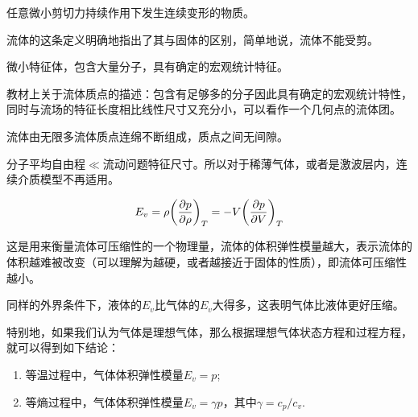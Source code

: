 


\begin{definition}[流体]
	任意微小剪切力持续作用下发生连续变形的物质。
\end{definition}

\begin{tip}
	流体的这条定义明确地指出了其与固体的区别，简单地说，流体不能受剪。
\end{tip}


\begin{definition}
	微小特征体，包含大量分子，具有确定的宏观统计特征。
\end{definition}

\begin{tip}
	教材上关于流体质点的描述：包含有足够多的分子因此具有确定的宏观统计特性，同时与流场的特征长度相比线性尺寸又充分小，可以看作一个几何点的流体团。
\end{tip}


\begin{definition}[连续介质模型]
	流体由无限多流体质点连绵不断组成，质点之间无间隙。
\end{definition}


分子平均自由程$\ll$流动问题特征尺寸。所以对于稀薄气体，或者是激波层内，连续介质模型不再适用。



\begin{equation}
	E_v = \rho \qty(\pdv{p}{\rho})_T = -V \qty(\pdv{p}{V})_T
\end{equation}

这是用来衡量流体可压缩性的一个物理量，流体的体积弹性模量越大，表示流体的体积越难被改变（可以理解为越硬，或者越接近于固体的性质），即流体可压缩性越小。

同样的外界条件下，液体的$E_v$比气体的$E_v$大得多，这表明气体比液体更好压缩。

特别地，如果我们认为气体是理想气体，那么根据理想气体状态方程和过程方程，就可以得到如下结论：

\begin{enumerate}
	\item 等温过程中，气体体积弹性模量$E_v = p$;
	\item 等熵过程中，气体体积弹性模量$E_v = \gamma p$，其中$\gamma = c_p / c_v$. 
\end{enumerate}

